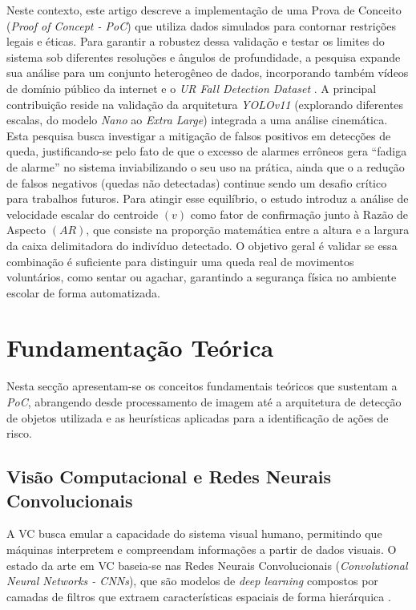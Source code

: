 \documentclass[12pt]{article}
\begin{document}
Neste contexto, este artigo descreve a implementação de uma Prova de Conceito (\textit{Proof of Concept - PoC})
que utiliza dados simulados para contornar restrições legais e éticas. Para garantir a robustez dessa validação
e testar os limites do sistema sob diferentes resoluções e ângulos de profundidade, a pesquisa expande sua
análise para um conjunto heterogêneo de dados, incorporando também vídeos de domínio público da internet e 
o \textit{UR Fall Detection Dataset} \cite{kwolek2014human}. A principal contribuição reside na validação
da arquitetura \textit{YOLOv11} (explorando diferentes escalas, do modelo \textit{Nano} ao \textit{Extra Large}) 
integrada a uma análise cinemática. Esta pesquisa busca investigar a mitigação de falsos positivos em detecções
de queda, justificando-se pelo fato de que o excesso de alarmes errôneos gera ``fadiga de alarme'' no sistema
inviabilizando o seu uso na prática, ainda que o a redução de falsos negativos (quedas não detectadas) continue
sendo um desafio crítico para trabalhos futuros. Para atingir esse equilíbrio, o estudo introduz a análise de
velocidade escalar do centroide $(v)$ como fator de confirmação junto à Razão de Aspecto $(AR)$, que consiste
na proporção matemática entre a altura e a largura da caixa delimitadora do indivíduo detectado. O objetivo
geral é validar se essa combinação é suficiente para distinguir uma queda real de movimentos voluntários,
como sentar ou agachar, garantindo a segurança física no ambiente escolar de forma automatizada.

\section{Fundamentação Teórica} \label{fundamentacao-teorica}

Nesta secção apresentam-se os conceitos fundamentais teóricos que sustentam a \textit{PoC}, abrangendo desde 
processamento de imagem até a arquitetura de detecção de objetos utilizada e as heurísticas aplicadas
para a identificação de ações de risco.

\subsection{Visão Computacional e Redes Neurais Convolucionais}

A VC busca emular a capacidade do sistema visual humano, permitindo que máquinas interpretem e compreendam
informações a partir de dados visuais. O estado da arte em VC baseia-se nas Redes Neurais Convolucionais
(\textit{Convolutional Neural Networks - CNNs}), que são modelos de \textit{deep learning} compostos por 
camadas de filtros que extraem características espaciais de forma hierárquica \cite{ibm:25}.
\end{document}
